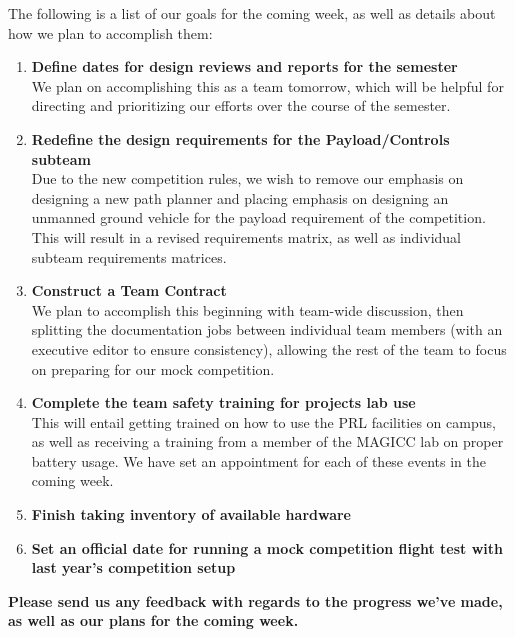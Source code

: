 \documentclass[]{../auvsi_doc}
\begin{document}
The following is a list of our goals for the coming week, as well as details about how we plan to accomplish them:

\begin{enumerate}
\item \textbf{Define dates for design reviews and reports for the semester}\\
We plan on accomplishing this as a team tomorrow, which will be helpful for directing and prioritizing our efforts over the course of the semester.
\item \textbf{Redefine the design requirements for the Payload/Controls subteam}\\
Due to the new competition rules, we wish to remove our emphasis on designing a new path planner and placing emphasis on designing an unmanned ground vehicle for the payload requirement of the competition. This will result in a revised requirements matrix, as well as individual subteam requirements matrices.
\item \textbf{Construct a Team Contract}\\
We plan to accomplish this beginning with team-wide discussion, then splitting the documentation jobs between individual team members (with an executive editor to ensure consistency), allowing the rest of the team to focus on preparing for our mock competition.
\item \textbf{Complete the team safety training for projects lab use}\\
This will entail getting trained on how to use the PRL facilities on campus, as well as receiving a training from a member of the MAGICC lab on proper battery usage. We have set an appointment for each of these events in the coming week.
\item \textbf{Finish taking inventory of available hardware}
\item \textbf{Set an official date for running a mock competition flight test with last year's competition setup}
\end{enumerate}

\textbf{Please send us any feedback with regards to the progress we've made, as well as our plans for the coming week.}
\end{document}

